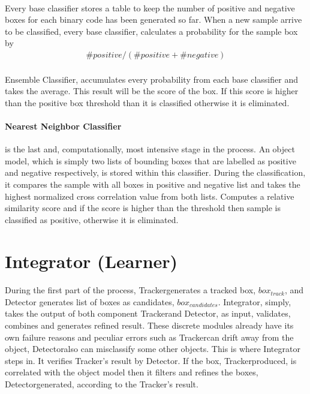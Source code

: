 \documentclass{report}
\newcommand{\Tracker}{Tracker}
\newcommand{\Detector}{Detector}
\begin{document}
        \paragraph{}
            Every base classifier stores a table to keep the number of positive and negative boxes
            for each binary code has been generated so far. When a new sample arrive to be classified,
            every base classifier, calculates a probability for the sample box by
            \begin{gather}
                \#positive / (\#positive + \#negative)
            \end{gather}
        \paragraph{}
            Ensemble Classifier, accumulates every probability from each base classifier and takes the average. This result
            will be the score of the box. If this score is higher than the positive box threshold than it is classified otherwise
            it is eliminated.
        \paragraph{Nearest Neighbor Classifier} is the last and, computationally, most intensive stage in the process.
            An object model, which is simply two lists of bounding boxes that are labelled as positive and negative respectively,
            is stored within this classifier. During the classification, it compares the sample with all
            boxes in positive and negative list and takes the highest normalized cross correlation value from both lists.
            Computes a relative similarity score and if the score is higher than the threshold then sample is
            classified as positive, otherwise it is eliminated.
    \section{Integrator (Learner)}
        \paragraph{}
            During the first part of the process, \Tracker generates a tracked box, $ box_{track} $, and Detector generates list of
            boxes as candidates, $ box_{candidates} $. Integrator, simply, takes the output of
            both component \Tracker and \Detector, as input, validates, combines
            and generates refined result. These discrete modules already have its own failure reasons
            and peculiar errors such as \Tracker can drift away from the object, \Detector also can misclassify some other objects.
            This is where Integrator steps in. It verifies \Tracker's result by \Detector.
            If the box, \Tracker produced, is correlated with the object model then it filters and refines the boxes,
            \Detector generated, according to the \Tracker's result.
\end{document}
